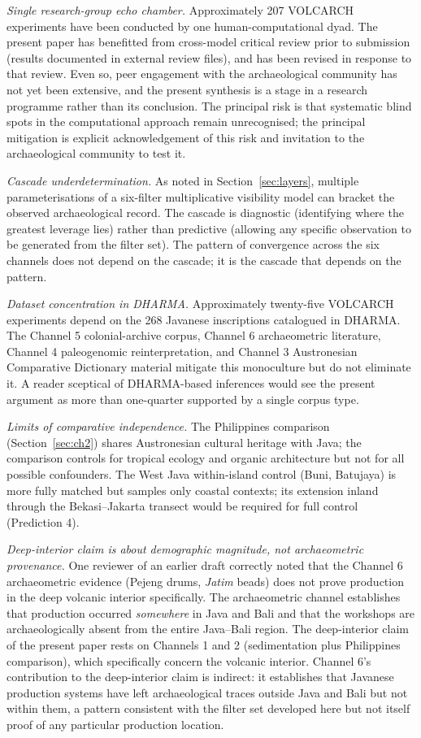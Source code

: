 \documentclass[12pt,a4paper]{article}
\begin{document}
\textit{Single research-group echo chamber.} Approximately 207 VOLCARCH experiments have been conducted by one human-computational dyad. The present paper has benefitted from cross-model critical review prior to submission (results documented in external review files), and has been revised in response to that review. Even so, peer engagement with the archaeological community has not yet been extensive, and the present synthesis is a stage in a research programme rather than its conclusion. The principal risk is that systematic blind spots in the computational approach remain unrecognised; the principal mitigation is explicit acknowledgement of this risk and invitation to the archaeological community to test it.

\textit{Cascade underdetermination.} As noted in Section~\ref{sec:layers}, multiple parameterisations of a six-filter multiplicative visibility model can bracket the observed archaeological record. The cascade is diagnostic (identifying where the greatest leverage lies) rather than predictive (allowing any specific observation to be generated from the filter set). The pattern of convergence across the six channels does not depend on the cascade; it is the cascade that depends on the pattern.

\textit{Dataset concentration in DHARMA.} Approximately twenty-five VOLCARCH experiments depend on the 268 Javanese inscriptions catalogued in DHARMA. The Channel 5 colonial-archive corpus, Channel 6 archaeometric literature, Channel 4 paleogenomic reinterpretation, and Channel 3 Austronesian Comparative Dictionary material mitigate this monoculture but do not eliminate it. A reader sceptical of DHARMA-based inferences would see the present argument as more than one-quarter supported by a single corpus type.

\textit{Limits of comparative independence.} The Philippines comparison (Section~\ref{sec:ch2}) shares Austronesian cultural heritage with Java; the comparison controls for tropical ecology and organic architecture but not for all possible confounders. The West Java within-island control (Buni, Batujaya) is more fully matched but samples only coastal contexts; its extension inland through the Bekasi--Jakarta transect would be required for full control (Prediction 4).

\textit{Deep-interior claim is about demographic magnitude, not archaeometric provenance.} One reviewer of an earlier draft correctly noted that the Channel 6 archaeometric evidence (Pejeng drums, \textit{Jatim} beads) does not prove production in the deep volcanic interior specifically. The archaeometric channel establishes that production occurred \textit{somewhere} in Java and Bali and that the workshops are archaeologically absent from the entire Java--Bali region. The deep-interior claim of the present paper rests on Channels 1 and 2 (sedimentation plus Philippines comparison), which specifically concern the volcanic interior. Channel 6's contribution to the deep-interior claim is indirect: it establishes that Javanese production systems have left archaeological traces outside Java and Bali but not within them, a pattern consistent with the filter set developed here but not itself proof of any particular production location.
\end{document}
